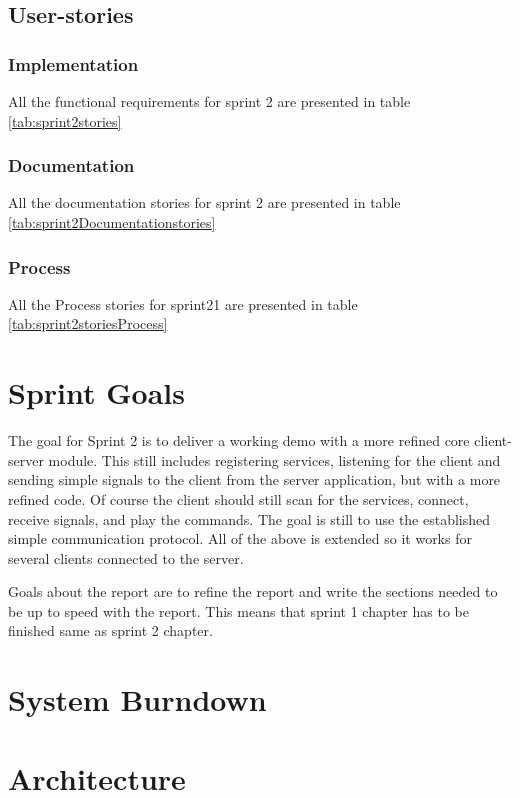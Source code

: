 \subsection{User-stories}

\subsubsection*{Implementation}
All the functional requirements for sprint 2 are presented in table \ref{tab:sprint2stories}

\subsubsection*{Documentation}
All the documentation stories for sprint 2 are presented in table \ref{tab:sprint2Documentationstories}

\subsubsection*{Process}
All the Process stories for sprint21 are presented in table \ref{tab:sprint2storiesProcess}


\section{Sprint Goals}
The goal for Sprint 2 is to deliver a working demo with a more refined core client-server module. 
This still includes registering services, listening for the client and sending simple signals to the client from the server application, but with a more refined code. 
Of course the client should still scan for the services, connect, receive signals, and play the commands. 
The goal is still to use the established simple communication protocol. 
All of the above is extended so it works for several clients connected to the server.

Goals about the report are to refine the report and write the sections needed to be up to speed with the report. This means that sprint 1 chapter has to be finished same as sprint 2 chapter. 
\section{System Burndown}
\section{Architecture}
